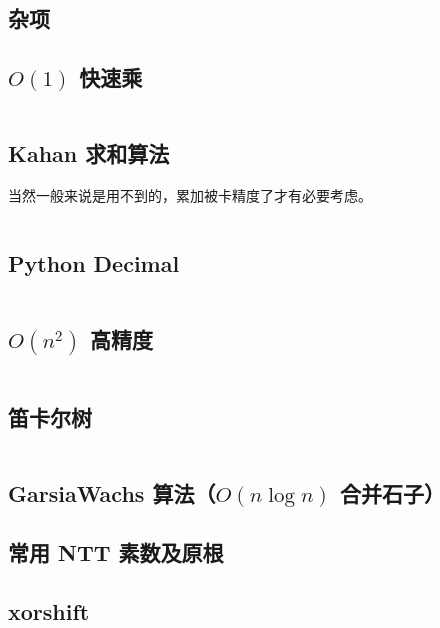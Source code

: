 \documentclass[a4paper, twoside]{article}
\begin{document}
	\begin{multicols}{2}
		\section{杂项}
			\subsection{$O(1)$ 快速乘}

				\inputminted{cpp}{../src/misc/O(1)快速乘.cpp}
			
			\subsection[Kahan 求和算法（减少浮点数累加的误差）]{Kahan 求和算法}
				当然一般来说是用不到的，累加被卡精度了才有必要考虑。
				\inputminted{cpp}{../src/misc/kahan.cpp}
			
			\subsection{Python Decimal}
				\inputminted{python}{../src/misc/decimal.py}
			
			\subsection{$O(n^2)$ 高精度}
				\inputminted{cpp}{../src/misc/高精度.cpp}
			
			\subsection{笛卡尔树}
				\inputminted{cpp}{../src/misc/笛卡尔树.cpp}
			
			\subsection{GarsiaWachs 算法（$O(n\log n)$ 合并石子）}
				
			
			\subsection{常用 NTT 素数及原根}
				

			\subsection{xorshift}
				\inputminted{cpp}{../src/misc/xorshift.cpp}
			

\end{multicols}
\end{document}
